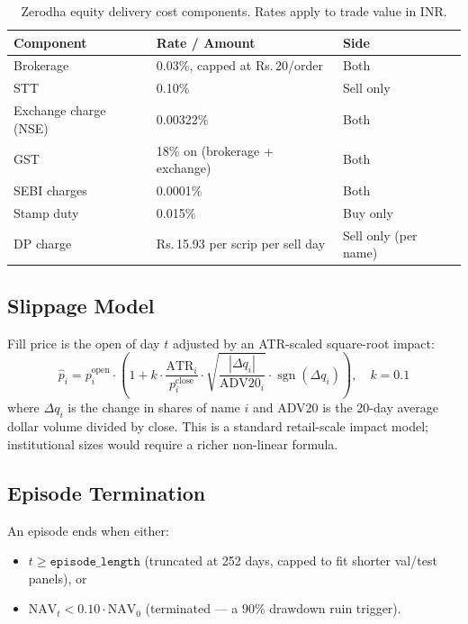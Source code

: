 \documentclass[11pt,a4paper]{article}
\begin{document}
\begin{table}[h]
\centering
\caption{Zerodha equity delivery cost components. Rates apply to trade value in INR.}
\label{tab:costs}
\small
\begin{tabularx}{\textwidth}{l l X}
\toprule
\textbf{Component} & \textbf{Rate / Amount} & \textbf{Side} \\
\midrule
Brokerage & 0.03\%, capped at \textrm{Rs.}\,20/order & Both \\
STT & 0.10\% & Sell only \\
Exchange charge (NSE) & 0.00322\% & Both \\
GST & 18\% on (brokerage + exchange) & Both \\
SEBI charges & 0.0001\% & Both \\
Stamp duty & 0.015\% & Buy only \\
DP charge & \textrm{Rs.}\,15.93 per scrip per sell day & Sell only (per name) \\
\bottomrule
\end{tabularx}
\end{table}

\subsection{Slippage Model}

Fill price is the open of day $t$ adjusted by an ATR-scaled square-root impact:
\begin{equation}
\hat{p}_i = p^{\text{open}}_i \cdot \left(1 + k \cdot \frac{\text{ATR}_i}{p^{\text{close}}_i}
            \cdot \sqrt{\frac{|\Delta q_i|}{\text{ADV20}_i}}
            \cdot \operatorname{sgn}(\Delta q_i) \right),\quad k = 0.1
\end{equation}
where $\Delta q_i$ is the change in shares of name $i$ and ADV20 is the 20-day
average dollar volume divided by close. This is a standard retail-scale impact
model; institutional sizes would require a richer non-linear formula.

\subsection{Episode Termination}

An episode ends when either:
\begin{itemize}
\item $t \ge \texttt{episode\_length}$ (truncated at 252 days, capped to fit shorter
val/test panels), or
\item $\text{NAV}_t < 0.10 \cdot \text{NAV}_0$ (terminated --- a 90\% drawdown
ruin trigger).
\end{itemize}
\end{document}
